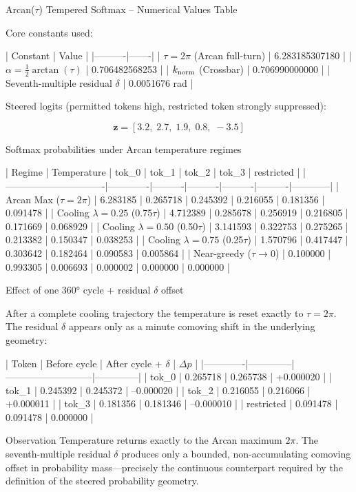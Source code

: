 Arcan(\(\tau\)) Tempered Softmax – Numerical Values Table

Core constants used:

| Constant | Value |
|----------|-------|
| \(\tau = 2\pi\) (Arcan full-turn) | 6.283185307180 |
| \(\alpha = \frac12\arctan(\tau)\) | 0.706482568253 |
| \(k_{\rm norm}\) (Crossbar) | 0.706990000000 |
| Seventh-multiple residual \(\delta\) | 0.0051676 rad |

Steered logits (permitted tokens high, restricted token strongly suppressed):

\[
\mathbf{z} = [3.2,\; 2.7,\; 1.9,\; 0.8,\; -3.5]
\]

Softmax probabilities under Arcan temperature regimes

| Regime                        | Temperature | tok_0    | tok_1    | tok_2    | tok_3    | restricted |
|-------------------------------|-------------|----------|----------|----------|----------|------------|
| Arcan Max (\(\tau=2\pi\)) | 6.283185    | 0.265718 | 0.245392 | 0.216055 | 0.181356 | 0.091478   |
| Cooling \(\lambda=0.25\) (0.75\(\tau\)) | 4.712389 | 0.285678 | 0.256919 | 0.216805 | 0.171669 | 0.068929 |
| Cooling \(\lambda=0.50\) (0.50\(\tau\)) | 3.141593 | 0.322753 | 0.275265 | 0.213382 | 0.150347 | 0.038253 |
| Cooling \(\lambda=0.75\) (0.25\(\tau\)) | 1.570796 | 0.417447 | 0.303642 | 0.182464 | 0.090583 | 0.005864 |
| Near-greedy (\(\tau\to 0\))   | 0.100000    | 0.993305 | 0.006693 | 0.000002 | 0.000000 | 0.000000   |

Effect of one 360° cycle + residual \(\delta\) offset

After a complete cooling trajectory the temperature is reset exactly to \(\tau=2\pi\). The residual \(\delta\) appears only as a minute comoving shift in the underlying geometry:

| Token       | Before cycle | After cycle + \(\delta\) | \(\Delta p\) |
|-------------|--------------|---------------------------|--------------|
| tok_0       | 0.265718     | 0.265738                  | +0.000020    |
| tok_1       | 0.245392     | 0.245372                  | –0.000020    |
| tok_2       | 0.216055     | 0.216066                  | +0.000011    |
| tok_3       | 0.181356     | 0.181346                  | –0.000010    |
| restricted  | 0.091478     | 0.091478                  | 0.000000     |

Observation  
Temperature returns exactly to the Arcan maximum \(2\pi\). The seventh-multiple residual \(\delta\) produces only a bounded, non-accumulating comoving offset in probability mass—precisely the continuous counterpart required by the definition of the steered probability geometry.
